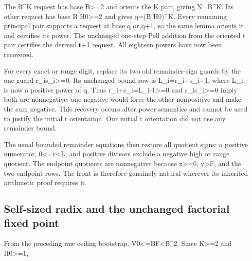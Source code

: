 The B\textasciicircum{}\allowbreak{}K request has base B\textgreater{}\allowbreak{}=\allowbreak{}2 and orients the K pair, giving N=\allowbreak{}B\textasciicircum{}\allowbreak{}K. Its other request has base B H0\textgreater{}\allowbreak{}=\allowbreak{}2 and gives q=\allowbreak{}(B H0)\textasciicircum{}\allowbreak{}K. Every remaining principal pair supports a request at base q or q+\allowbreak{}1, so the same lemma orients it and certifies its power. The unchanged one-step Pell addition from the oriented t pair certifies the derived t+\allowbreak{}1 request. All eighteen powers have now been recovered.



For every exact or range digit, replace its two old remainder-sign guards by the one guard r\_\allowbreak{}i\textasteriskcentered{}\allowbreak{}s\_\allowbreak{}i\textgreater{}\allowbreak{}=\allowbreak{}0. Its unchanged bound row is L\_\allowbreak{}i=\allowbreak{}r\_\allowbreak{}i+\allowbreak{}s\_\allowbreak{}i+\allowbreak{}1, where L\_\allowbreak{}i is now a positive power of q. Thus r\_\allowbreak{}i+\allowbreak{}s\_\allowbreak{}i=\allowbreak{}L\_\allowbreak{}i-1\textgreater{}\allowbreak{}=\allowbreak{}0 and r\_\allowbreak{}i\textasteriskcentered{}\allowbreak{}s\_\allowbreak{}i\textgreater{}\allowbreak{}=\allowbreak{}0 imply both are nonnegative: one negative would force the other nonpositive and make the sum negative. This recovery occurs after power semantics and cannot be used to justify the initial t orientation. Our initial t orientation did not use any remainder bound.



The usual bounded remainder equations then restore all quotient signs: a positive numerator, 0\textless{}\allowbreak{}=\allowbreak{}r\textless{}\allowbreak{}L, and positive divisors exclude a negative high or range quotient. The endpoint quotients are nonnegative because x\textgreater{}\allowbreak{}=\allowbreak{}0, y\textgreater{}\allowbreak{}F, and the two endpoint rows. The front is therefore genuinely natural wherever its inherited arithmetic proof requires it.



\subsection{Self-sized radix and the unchanged factorial fixed point}



From the preceding raw ceiling bootstrap, V0\textless{}\allowbreak{}=\allowbreak{}BF\textless{}\allowbreak{}B\textasciicircum{}\allowbreak{}2. Since K\textgreater{}\allowbreak{}=\allowbreak{}2 and H0\textgreater{}\allowbreak{}=\allowbreak{}1,



